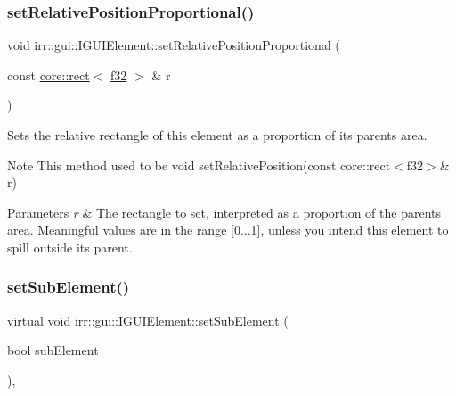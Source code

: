 \subsubsection{\texorpdfstring{set\+Relative\+Position\+Proportional()}{setRelativePositionProportional()}\hspace{0.1cm}{\footnotesize\ttfamily [2/2]}}
{\footnotesize\ttfamily void irr\+::gui\+::\+I\+G\+U\+I\+Element\+::set\+Relative\+Position\+Proportional (\begin{DoxyParamCaption}\item[{const \hyperlink{classirr_1_1core_1_1rect}{core\+::rect}$<$ \hyperlink{namespaceirr_a0277be98d67dc26ff93b1a6a1d086b07}{f32} $>$ \&}]{r }\end{DoxyParamCaption})\hspace{0.3cm}{\ttfamily [inline]}}



Sets the relative rectangle of this element as a proportion of its parent\textquotesingle{}s area. 

\begin{DoxyNote}{Note}
This method used to be \textquotesingle{}void set\+Relative\+Position(const core\+::rect$<$f32$>$\& r)\textquotesingle{} 
\end{DoxyNote}

\begin{DoxyParams}{Parameters}
{\em r} & The rectangle to set, interpreted as a proportion of the parent\textquotesingle{}s area. Meaningful values are in the range \mbox{[}0...1\mbox{]}, unless you intend this element to spill outside its parent. \\
\hline
\end{DoxyParams}
\mbox{\label{classirr_1_1gui_1_1IGUIElement_a50eb859808b65ee24fbdd69e69118a8d}} 
\subsubsection{\texorpdfstring{set\+Sub\+Element()}{setSubElement()}\hspace{0.1cm}{\footnotesize\ttfamily [1/2]}}
{\footnotesize\ttfamily virtual void irr\+::gui\+::\+I\+G\+U\+I\+Element\+::set\+Sub\+Element (\begin{DoxyParamCaption}\item[{bool}]{sub\+Element }\end{DoxyParamCaption})\hspace{0.3cm}{\ttfamily [inline]}, {\ttfamily [virtual]}}



